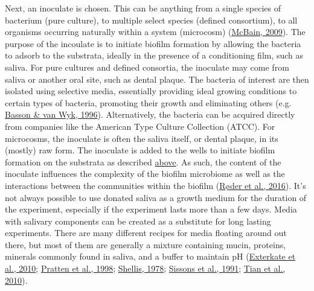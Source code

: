 \documentclass[
  letterpaper,
]{book}
\begin{document}
Next, an inoculate is chosen. This can be anything from a single species
of bacterium (pure culture), to multiple select species (defined
consortium), to all organisms occurring naturally within a system
(microcosm) (\protect\hyperlink{ref-mcbainBiofilmModels2009}{McBain,
2009}). The purpose of the incoulate is to initiate biofilm formation by
allowing the bacteria to adsorb to the substrata, ideally in the
presence of a conditioning film, such as saliva. For pure cultures and
defined consortia, the inoculate may come from saliva or another oral
site, such as dental plaque. The bacteria of interest are then isolated
using selective media, essentially providing ideal growing conditions to
certain types of bacteria, promoting their growth and eliminating others
(e.g. \protect\hyperlink{ref-bassonEstablishmentCommunity1996}{Basson \&
van Wyk, 1996}). Alternatively, the bacteria can be acquired directly
from companies like the American Type Culture Collection (ATCC). For
microcosms, the inoculate is often the saliva itself, or dental plaque,
in its (mostly) raw form. The inoculate is added to the wells to
initiate biofilm formation on the substrata as described
\protect\hyperlink{dental-plaque}{above}. As such, the content of the
inoculate influences the complexity of the biofilm microbiome as well as
the interactions between the communities within the biofilm
(\protect\hyperlink{ref-roderStudyingBacterial2016}{Røder et al.,
2016}). It's not always possible to use donated saliva as a growth
medium for the duration of the experiment, especially if the experiment
lasts more than a few days. Media with salivary components can be
created as a substitute for long lasting experiments. There are many
different recipes for media floating around out there, but most of them
are generally a mixture containing mucin, proteins, minerals commonly
found in saliva, and a buffer to maintain pH
(\protect\hyperlink{ref-extercateAAA2010}{Exterkate et al., 2010};
\protect\hyperlink{ref-prattenVitroStudies1998}{Pratten et al., 1998};
\protect\hyperlink{ref-shellisSyntheticSaliva1978}{Shellis, 1978};
\protect\hyperlink{ref-sissonsMultistationPlaque1991}{Sissons et al.,
1991}; \protect\hyperlink{ref-tianUsingDGGE2010}{Tian et al., 2010}).
\end{document}

